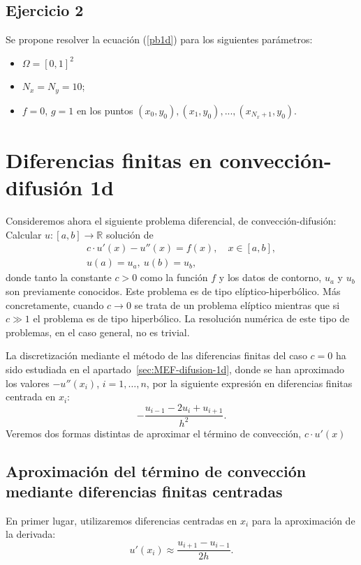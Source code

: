 \documentclass[11pt,spanish,a4wide]{article}
\def\Rset{\mathbb{R}}
\begin{document}
\subsection{Ejercicio 2}
Se propone resolver la ecuación (\ref{pb1d}) para los siguientes
parámetros:
\begin{itemize}
\item $\Omega=[0,1]^2$
\item $N_x=N_y=10$;
\item $f=0$, $g=1$ en los puntos $(x_0,y_0), (x_1,y_0),...,(x_{N_x+1},y_0)$.
\end{itemize}


\section{Diferencias finitas en convección-difusión 1d}

\label{sec:MEF-conveccion-difusion-1d}

Consideremos ahora el siguiente problema diferencial, de
convección-difusión: Calcular $u:[a,b] \to \Rset$ solución de
\begin{align}
  \label{pb.conveccion-difusion-1d}
  c \cdot u'(x) - u''(x) = f(x), \quad x\in[a,b], \\
  u(a)=u_a, \ u(b)=u_b,
\end{align}
donde tanto la constante $c>0$ como la función $f$ y los datos de
contorno, $u_a$ y $u_b$ son previamente conocidos. Este problema es de
tipo elíptico-hiperbólico. Más concretamente, cuando $c\to 0$ se trata
de un problema elíptico mientras que si $c\gg 1$ el problema es de
tipo hiperbólico. La resolución numérica de este tipo de problemas, en
el caso general, no es trivial.

La discretización mediante el método de las diferencias finitas del
caso $c=0$ ha sido estudiada en el apartado~\ref{sec:MEF-difusion-1d},
donde se han aproximado los valores $-u''(x_i)$, $i=1,\dots,n$, por la
siguiente expresión en diferencias finitas centrada en $x_i$:
$$
-\frac{u_{i-1}-2u_i + u_{i+1}}{h^2}.
$$
Veremos dos formas distintas de aproximar el término de convección,
$c\cdot u'(x)$

\subsection{Aproximación del término de convección mediante
  diferencias finitas centradas}
\label{sec:conveccion-difusion-1d}

En primer lugar, utilizaremos diferencias centradas en $x_i$
para la aproximación de la derivada:
$$
u'(x_i) \approx \frac{u_{i+1}-u_{i-1}}{2h}.
$$
\end{document}
